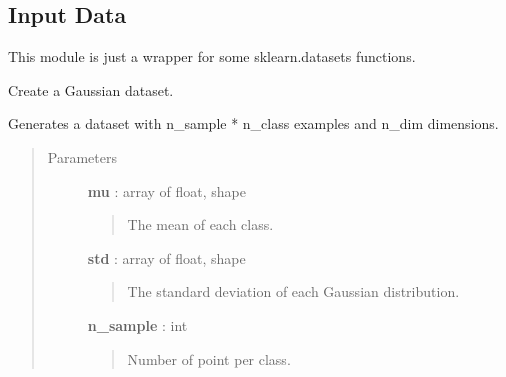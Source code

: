 \documentclass[letterpaper,10pt,english]{sphinxmanual}
\begin{document}
\subsection{Input Data}
\label{index:input-data}\label{index:module-adenine.utils.data_source}
This module is just a wrapper for some sklearn.datasets functions.

\begin{fulllineitems}
\label{index:adenine.utils.data_source.generate_gauss}
Create a Gaussian dataset.

Generates a dataset with n\_sample * n\_class examples and n\_dim dimensions.
\begin{quote}\begin{description}
\item[{Parameters}] \leavevmode
\textbf{mu} : array of float, shape
\begin{quote}

The mean of each class.
\end{quote}

\textbf{std} :  array of float, shape
\begin{quote}

The standard deviation of each Gaussian distribution.
\end{quote}

\textbf{n\_sample} : int
\begin{quote}

Number of point per class.
\end{quote}

\end{description}\end{quote}

\end{fulllineitems}

\end{document}

